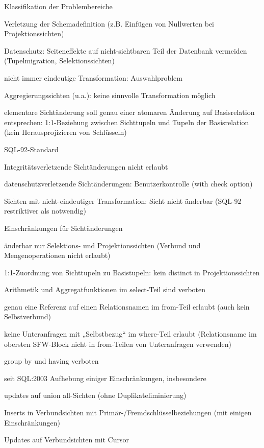 \documentclass[a4paper]{article}
\begin{document}
\begin{multicols}{3}
\begin{itemize*}
        Klassifikation der Problembereiche
        \begin{itemize*}
            \item Verletzung der Schemadefinition (z.B. Einfügen von Nullwerten bei Projektionssichten)
            \item Datenschutz: Seiteneffekte auf nicht-sichtbaren Teil der Datenbank vermeiden (Tupelmigration, Selektionssichten)
            \item nicht immer eindeutige Transformation: Auswahlproblem
            \item Aggregierungssichten (u.a.): keine sinnvolle Transformation möglich
            \item elementare Sichtänderung soll genau einer atomaren Änderung auf Basisrelation entsprechen: 1:1-Beziehung zwischen Sichttupeln und Tupeln der Basisrelation (kein Herausprojizieren von Schlüsseln)
        \end{itemize*}

        SQL-92-Standard
        \begin{itemize*}
            \item Integritätsverletzende Sichtänderungen nicht erlaubt
            \item datenschutzverletzende Sichtänderungen: Benutzerkontrolle (with check option)
            \item Sichten mit nicht-eindeutiger Transformation: Sicht nicht änderbar (SQL-92 restriktiver als notwendig)
        \end{itemize*}

        Einschränkungen für Sichtänderungen
        \begin{itemize*}
            \item änderbar nur Selektions- und Projektionssichten (Verbund und Mengenoperationen nicht erlaubt)
            \item 1:1-Zuordnung von Sichttupeln zu Basistupeln: kein distinct in Projektionssichten
            \item Arithmetik und Aggregatfunktionen im select-Teil sind verboten
            \item genau eine Referenz auf einen Relationsnamen im from-Teil erlaubt (auch kein Selbstverbund)
            \item keine Unteranfragen mit „Selbstbezug“ im where-Teil erlaubt (Relationsname im obersten SFW-Block nicht in from-Teilen von Unteranfragen verwenden)
            \item group by und having verboten
            \item seit SQL:2003 Aufhebung einiger Einschränkungen, insbesondere
            \begin{itemize*}
                \item updates auf union all-Sichten (ohne Duplikateliminierung)
                \item Inserts in Verbundsichten mit Primär-/Fremdschlüsselbeziehungen (mit einigen Einschränkungen)
                \item Updates auf Verbundsichten mit Cursor
            \end{itemize*}
        \end{itemize*}


\end{itemize*}
\end{multicols}
\end{document}
